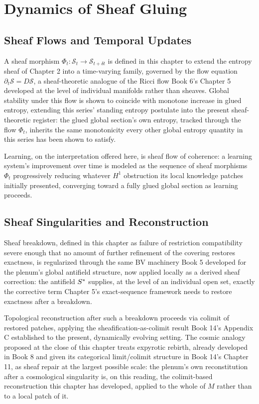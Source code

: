 \part{Dynamics of Sheaf Gluing}

\chapter{Sheaf Flows and Temporal Updates}

A sheaf morphism $\Phi_t: \mathcal{S}_t \to \mathcal{S}_{t+\delta t}$ is defined in this chapter to extend the entropy sheaf of Chapter 2 into a time-varying family, governed by the flow equation $\partial_t \mathcal{S} = D\mathcal{S}$, a sheaf-theoretic analogue of the Ricci flow Book 6's Chapter 5 developed at the level of individual manifolds rather than sheaves. Global stability under this flow is shown to coincide with monotone increase in glued entropy, extending this series' standing entropy postulate into the present sheaf-theoretic register: the glued global section's own entropy, tracked through the flow $\Phi_t$, inherits the same monotonicity every other global entropy quantity in this series has been shown to satisfy.

Learning, on the interpretation offered here, is sheaf flow of coherence: a learning system's improvement over time is modeled as the sequence of sheaf morphisms $\Phi_t$ progressively reducing whatever $H^1$ obstruction its local knowledge patches initially presented, converging toward a fully glued global section as learning proceeds.

\chapter{Sheaf Singularities and Reconstruction}

Sheaf breakdown, defined in this chapter as failure of restriction compatibility severe enough that no amount of further refinement of the covering restores exactness, is regularized through the same BV machinery Book 5 developed for the plenum's global antifield structure, now applied locally as a derived sheaf correction: the antifield $S^{*}$ supplies, at the level of an individual open set, exactly the corrective term Chapter 5's exact-sequence framework needs to restore exactness after a breakdown.

Topological reconstruction after such a breakdown proceeds via colimit of restored patches, applying the sheafification-as-colimit result Book 14's Appendix C established to the present, dynamically evolving setting. The cosmic analogy proposed at the close of this chapter treats expyrotic rebirth, already developed in Book 8 and given its categorical limit/colimit structure in Book 14's Chapter 11, as sheaf repair at the largest possible scale: the plenum's own reconstitution after a cosmological singularity is, on this reading, the colimit-based reconstruction this chapter has developed, applied to the whole of $M$ rather than to a local patch of it.

